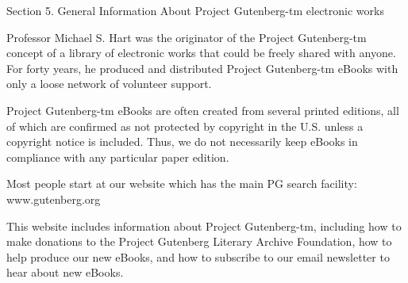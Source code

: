 Section 5. General Information About Project Gutenberg-tm electronic works

Professor Michael S. Hart was the originator of the Project
Gutenberg-tm concept of a library of electronic works that could be
freely shared with anyone. For forty years, he produced and
distributed Project Gutenberg-tm eBooks with only a loose network of
volunteer support.

Project Gutenberg-tm eBooks are often created from several printed
editions, all of which are confirmed as not protected by copyright in
the U.S. unless a copyright notice is included. Thus, we do not
necessarily keep eBooks in compliance with any particular paper
edition.

Most people start at our website which has the main PG search
facility: www.gutenberg.org

This website includes information about Project Gutenberg-tm,
including how to make donations to the Project Gutenberg Literary
Archive Foundation, how to help produce our new eBooks, and how to
subscribe to our email newsletter to hear about new eBooks.
